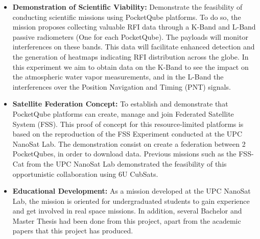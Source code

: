 \begin{itemize}
    \item \textbf{Demonstration of Scientific Viability:} Demonstrate the feasibility of 
    conducting scientific missions using PocketQube platforms. To do so, the mission
    proposes collecting valuable RFI data through a K-Band and L-Band passive 
    radiometers (One for each PocketQube). The payloads will monitor interferences on 
    these bands. This data will facilitate enhanced detection and the generation of
    heatmaps indicating RFI distribution across the globe. In this experiment we aim
    to obtain data on the K-Band to see the impact on the atmospheric water vapor 
    measurements, and in the L-Band the interferences over the Position Navigation 
    and Timing (PNT) signals.

    \item \textbf{Satellite Federation Concept:} To establish and demonstrate that 
    PocketQube platforms can create, manage and join Federated Satellite System 
    (FSS). This proof of concept for this resource-limited platforms is based on 
    the reproduction of the FSS Experiment conducted at the UPC NanoSat Lab. The 
    demonstration consist on create a federation between 2 PocketQubes, in order 
    to download data. Previous missions such as the FSS-Cat from the UPC NanoSat 
    Lab demonstrated the feasibility of this opportunistic collaboration using 6U 
    CubSats.

    \item \textbf{Educational Development:}  As a mission developed at the UPC NanoSat
     Lab, the mission is oriented for undergraduated students to gain experience and 
     get involved in real space missions. In addition, several Bachelor and Master 
     Thesis had been done from this project, apart from the academic papers that 
     this project has produced.

\end{itemize}

